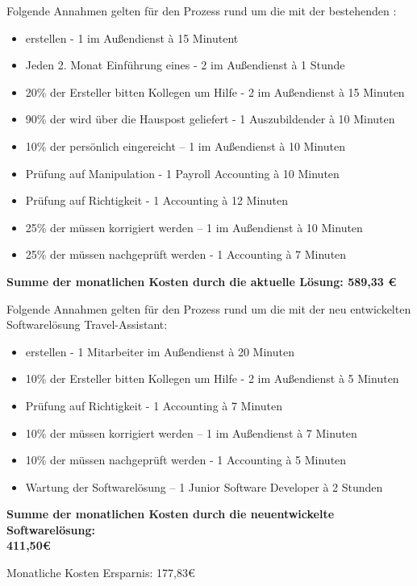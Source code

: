 Folgende Annahmen gelten für den Prozess rund um die  mit der bestehenden :
\begin{itemize}
\item {} erstellen - 1  im Außendienst à 15 Minutent
\item Jeden 2. Monat Einführung eines  - 2  im Außendienst à 1 Stunde
\item 20\% der Ersteller bitten Kollegen um Hilfe - 2  im Außendienst à 15 Minuten
\item 90\% der  wird über die Hauspost geliefert - 1 Auszubildender à 10 Minuten
\item 10\% der  persönlich eingereicht – 1  im Außendienst à 10 Minuten
\item Prüfung auf Manipulation - 1  Payroll Accounting à 10 Minuten
\item Prüfung auf Richtigkeit - 1  Accounting à 12 Minuten
\item 25\% der  müssen korrigiert werden – 1  im Außendienst à 10 Minuten
\item 25\% der  müssen nachgeprüft werden - 1  Accounting à 7 Minuten
\end{itemize}

\textbf{Summe der monatlichen Kosten durch die aktuelle Lösung: 589,33 €}

Folgende Annahmen gelten für den Prozess rund um die  mit der neu entwickelten Softwarelösung Travel-Assistant:
\begin{itemize}
\item {} erstellen - 1 Mitarbeiter im Außendienst à 20 Minuten
\item 10\% der Ersteller bitten Kollegen um Hilfe - 2  im Außendienst à 5 Minuten
\item Prüfung auf Richtigkeit - 1  Accounting à 7 Minuten
\item 10\% der  müssen korrigiert werden – 1  im Außendienst à 7 Minuten
\item 10\% der  müssen nachgeprüft werden - 1  Accounting à 5 Minuten
\item Wartung der Softwarelösung – 1 Junior Software Developer à 2 Stunden
\end{itemize}

\textbf{Summe der monatlichen Kosten durch die neuentwickelte Softwarelösung:\\ 411,50€}

Monatliche Kosten Ersparnis: 177,83€

